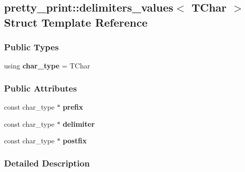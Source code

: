 \hypertarget{structpretty__print_1_1delimiters__values}{}\subsection{pretty\+\_\+print\+:\+:delimiters\+\_\+values$<$ T\+Char $>$ Struct Template Reference}
\label{structpretty__print_1_1delimiters__values}
\subsubsection*{Public Types}
\begin{DoxyCompactItemize}
\item 
using {\bfseries char\+\_\+type} = T\+Char\hypertarget{structpretty__print_1_1delimiters__values_a1a8b132b5b563255f3e7e253e0f4cf1c}{}\label{structpretty__print_1_1delimiters__values_a1a8b132b5b563255f3e7e253e0f4cf1c}

\end{DoxyCompactItemize}
\subsubsection*{Public Attributes}
\begin{DoxyCompactItemize}
\item 
const char\+\_\+type $\ast$ {\bfseries prefix}\hypertarget{structpretty__print_1_1delimiters__values_abc52cf0ab6ba5a8be873432e84c92f92}{}\label{structpretty__print_1_1delimiters__values_abc52cf0ab6ba5a8be873432e84c92f92}

\item 
const char\+\_\+type $\ast$ {\bfseries delimiter}\hypertarget{structpretty__print_1_1delimiters__values_a3d8f8df59ee22e200e6fc34f9d5b3a38}{}\label{structpretty__print_1_1delimiters__values_a3d8f8df59ee22e200e6fc34f9d5b3a38}

\item 
const char\+\_\+type $\ast$ {\bfseries postfix}\hypertarget{structpretty__print_1_1delimiters__values_ad166187598de35f5dbf2b918a4b374d6}{}\label{structpretty__print_1_1delimiters__values_ad166187598de35f5dbf2b918a4b374d6}

\end{DoxyCompactItemize}


\subsubsection{Detailed Description}
